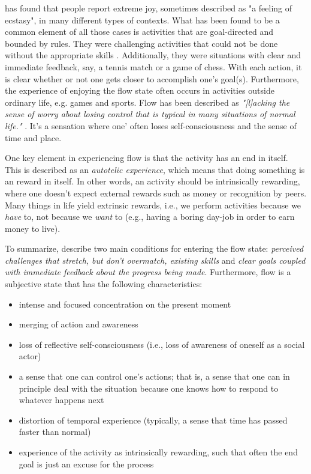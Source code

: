 \cite{flow} has found that people report extreme joy, sometimes described as "a feeling of ecstasy", in many different types of contexts. What has been found to be a common element of all those cases is activities that are goal-directed and bounded by rules. They were challenging activities that could not be done without the appropriate skills \citep{flow}. Additionally, they were situations with clear and immediate feedback, say, a tennis match or a game of chess. With each action, it is clear whether or not one gets closer to accomplish one's goal(s). Furthermore, the experience of enjoying the flow state often occurs in activities outside ordinary life, e.g. games and sports. Flow has been described as \textit{"[l]acking the sense of worry about losing control that is typical in many situations of normal life."} \citep{flow}. It's a sensation where one' often loses self-consciousness and the sense of time and place.

One key element in experiencing flow is that the activity has an end in itself. This is described as an \textit{autotelic experience}, which means that doing something is an reward in itself. In other words, an activity should be intrinsically rewarding, where one doesn't expect external rewards such as money or recognition by peers. Many things in life yield extrinsic rewards, i.e., we perform activities because we \textit{have} to, not because we \textit{want} to (e.g., having a boring day-job in order to earn money to live).

To summarize, \cite{flowTwo} describe two main conditions for entering the flow state: \textit{perceived challenges that stretch, but don't overmatch, existing skills} and \textit{clear goals coupled with immediate feedback about the progress being made}. Furthermore, flow is a subjective state that has the following characteristics:

\begin{itemize}
\item intense and focused concentration on the present moment
\item merging of action and awareness
\item loss of reflective self-consciousness (i.e., loss of awareness of oneself as a social actor)
\item a sense that one can control one's actions; that is, a sense that one can in principle deal with the situation because one knows how to respond to whatever happens next
\item distortion of temporal experience (typically, a sense that time has passed faster than normal)
\item experience of the activity as intrinsically rewarding, such that often the end goal is just an excuse for the process
\end{itemize}